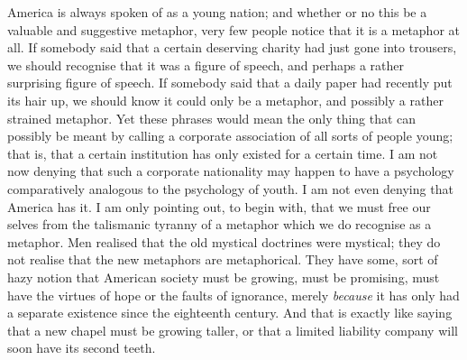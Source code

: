 \documentclass{book}
\begin{document}
America is always spoken of as a young nation; and whether or no this be a valuable and suggestive metaphor, very few people notice that it is a metaphor at all. If somebody said that a certain deserving charity had just gone into trousers, we should recognise that it was a figure of speech, and perhaps a rather surprising figure of speech. If somebody said that a daily paper had recently put its hair up, we should know it could only be a metaphor, and possibly a rather strained metaphor. Yet these phrases would mean the only thing that can possibly be meant by calling a corporate association of all sorts of people young; that is, that a certain institution has only existed for a certain time. I am not now denying that such a corporate nationality may happen to have a psychology comparatively analogous to the psychology of youth. I am not even denying that America has it. I am only pointing out, to begin with, that we must free our selves from the talismanic tyranny of a metaphor which we do recognise as a metaphor. Men realised that the old mystical doctrines were mystical; they do not realise that the new metaphors are metaphorical. They have some, sort of hazy notion that American society must be growing, must be promising, must have the virtues of hope or the faults of ignorance, merely \emph{because} it has only had a separate existence since the eighteenth century. And that is exactly like saying that a new chapel must be growing taller, or that a limited liability company will soon have its second teeth.
\end{document}
